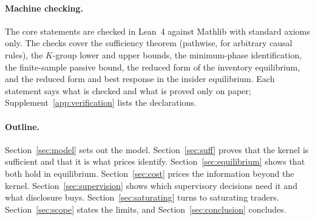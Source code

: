 \paragraph{Machine checking.} The core statements are checked in Lean~4 against Mathlib with standard axioms only. The checks cover the sufficiency theorem (pathwise, for arbitrary causal rules), the $K$-group lower and upper bounds, the minimum-phase identification, the finite-sample passive bound, the reduced form of the inventory equilibrium, and the reduced form and best response in the insider equilibrium. Each statement says what is checked and what is proved only on paper; Supplement~\ref{app:verification} lists the declarations.

\paragraph{Outline.} Section~\ref{sec:model} sets out the model. Section~\ref{sec:suff} proves that the kernel is sufficient and that it is what prices identify. Section~\ref{sec:equilibrium} shows that both hold in equilibrium. Section~\ref{sec:cost} prices the information beyond the kernel. Section~\ref{sec:supervision} shows which supervisory decisions need it and what disclosure buys. Section~\ref{sec:saturating} turns to saturating traders. Section~\ref{sec:scope} states the limits, and Section~\ref{sec:conclusion} concludes.
